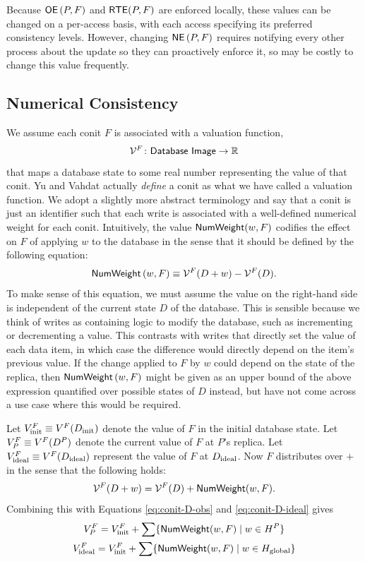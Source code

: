 \documentclass[]             %
{NASA}                       %
\theoremstyle{definition}
\begin{document}
Because $\mathsf{OE}\left(P, F\right)$ and $\mathsf{RTE}(P, F)$ are enforced
locally, these values can be changed on a per-access basis, with each
access specifying its preferred consistency levels. However, changing
$\mathsf{NE}\left(P, F\right)$ requires notifying every other process about
the update so they can proactively enforce it, so may be costly to
change this value frequently.

\subsection{Numerical Consistency}
\label{ssec:conit-numerical-consistency}
We assume each conit $F$ is associated with a valuation function,
\[
  \mathcal{V}^F\colon \mathsf{Database\ Image} \to \mathbb{R}
\]
that maps a database state to some real number representing the value
of that conit. Yu and Vahdat actually \emph{define} a conit as what we
have called a valuation function. We adopt a slightly more abstract
terminology and say that a conit is just an identifier such that each
write is associated with a well-defined numerical weight for each
conit. Intuitively, the value $\mathsf{NumWeight}(w, F)$ codifies the effect
on $F$ of applying $w$ to the database in the sense that it should be
defined by the following equation:
\begin{equation}
  \mathsf{NumWeight}\left(w, F\right) \equiv \mathcal{V}^F(D + w) - \mathcal{V}^F(D).
\end{equation}
To make sense of this equation, we must assume the value on the
right-hand side is independent of the current state $D$ of the
database. This is sensible because we think of writes as containing
logic to modify the database, such as incrementing or decrementing a
value. This contrasts with writes that directly set the value of each
data item, in which case the difference would directly depend on the
item's previous value.  If the change applied to $F$ by $w$ could
depend on the state of the replica, then $\mathsf{NumWeight}\left(w, F\right)$
might be given as an upper bound of the above expression quantified
over possible states of $D$ instead, but have not come across a use
case where this would be required.

Let $V^{F}_{\textrm{init}} \equiv V^F(D_\textrm{init})$ denote the value of $F$
in the initial database state. Let $V^F_P \equiv V^F(D^{P})$
denote the current value of $F$ at $P$'s replica. Let
$V^{F}_{\textrm{ideal}} \equiv V^F(D_{\textrm{ideal}})$ represent the value of $F$ at
$D_{\textrm{ideal}}$.  Now $F$ distributes over $+$ in the sense that the
following holds:
\begin{equation}
  \mathcal{V}^F(D + w) = \mathcal{V}^F(D) + \mathsf{NumWeight}(w, F).
\end{equation}
Combining this with Equations \eqref{eq:conit-D-obs} and
\eqref{eq:conit-D-ideal} gives
\begin{gather}
  V^{F}_{P} = V^{F}_{\textrm{init}} + \sum \{\mathsf{NumWeight}(w, F) \mid w \in H^{P}\} \\
  V^{F}_{\textrm{ideal}} = V^{F}_{\textrm{init}} + \sum \{\mathsf{NumWeight}(w, F) \mid w \in H_\mathrm{global}\}
\end{gather}
\end{document}

